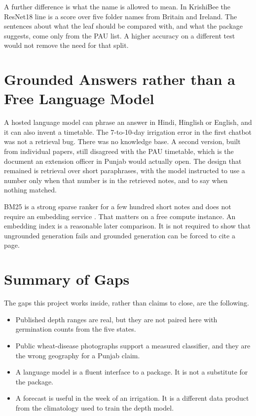A further difference is what the name is allowed to mean. In KrishiBee the ResNet18 line is a score over five folder names from Britain and Ireland. The sentences about what the leaf should be compared with, and what the package suggests, come only from the PAU list. A higher accuracy on a different test would not remove the need for that split.

\section{Grounded Answers rather than a Free Language Model}
A hosted language model can phrase an answer in Hindi, Hinglish or English, and it can also invent a timetable. The 7-to-10-day irrigation error in the first chatbot was not a retrieval bug. There was no knowledge base. A second version, built from individual papers, still disagreed with the PAU timetable, which is the document an extension officer in Punjab would actually open. The design that remained is retrieval over short paraphrases, with the model instructed to use a number only when that number is in the retrieved notes, and to say when nothing matched.

BM25 is a strong sparse ranker for a few hundred short notes and does not require an embedding service \cite{robertson2009bm25}. That matters on a free compute instance. An embedding index is a reasonable later comparison. It is not required to show that ungrounded generation fails and grounded generation can be forced to cite a page.

\section{Summary of Gaps}
The gaps this project works inside, rather than claims to close, are the following.

\begin{itemize}[leftmargin=1.4em]
    \item Published depth ranges are real, but they are not paired here with germination counts from the five states.
    \item Public wheat-disease photographs support a measured classifier, and they are the wrong geography for a Punjab claim.
    \item A language model is a fluent interface to a package. It is not a substitute for the package.
    \item A forecast is useful in the week of an irrigation. It is a different data product from the climatology used to train the depth model.
\end{itemize}
